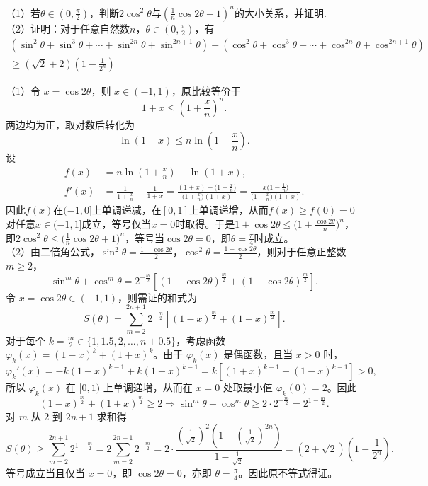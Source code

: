 \newpage
\begin{example}
    （1）若$\theta\in\left(0,\frac{\pi}2\right)$，判断$2\cos^2\theta$与$\left(\frac{1}{n}\cos 2\theta+1\right)^n$的大小关系，并证明.\\
    （2）证明：对于任意自然数$n$，$\theta\in\left(0,\frac{\pi}2\right)$，有
\begin{gather*}
\left(\sin^2\theta+\sin^3\theta+\cdots+\sin^{2n}\theta+\sin^{2n+1}\theta\right)+\left(\cos^2\theta+\cos^3\theta+\cdots+\cos^{2n}\theta+\cos^{2n+1}\theta\right)\\
\geq\left(\sqrt{2}+2\right)\left(1-\frac{1}{2^n}\right)
\end{gather*}
\end{example}
\begin{solution}
（1）令 \(x=\cos2\theta\)，则 \(x\in(-1,1)\)，原比较等价于
\[
1+x\le \left(1+\frac{x}{n}\right)^n.
\]
两边均为正，取对数后转化为
\[
\ln(1+x)\le n\ln\left(1+\frac{x}{n}\right).
\]
设
\begin{align*}
    f(x)&=n\ln\left(1+\frac{x}{n}\right)-\ln(1+x),\\
    f'(x)&=\frac{1}{1+\frac{x}{n}}-\frac{1}{1+x}=\frac{(1+x)-\bigl(1+\frac{x}{n}\bigr)}{\bigl(1+\frac{x}{n}\bigr)(1+x)}=\frac{x\bigl(1-\frac1n\bigr)}{\bigl(1+\frac{x}{n}\bigr)(1+x)}.
\end{align*}
因此$f(x)$在$(-1,0]$上单调递减，在$[0,1]$上单调递增，从而$f(x)\geqslant f(0)=0$对任意$x\in(-1,1]$成立，等号仅当$x=0$时取得。于是$1+\cos2\theta\leqslant\bigl(1+\frac{\cos2\theta}{n}\bigr)^n$，即$2\cos^2\theta\leqslant\bigl(\frac{1}{n}\cos2\theta+1\bigr)^n$，等号当$\cos2\theta=0$，即$\theta=\frac\pi4$时成立。\\
（2）由二倍角公式，\(\sin^2\theta = \frac{1-\cos2\theta}{2}\)，\(\cos^2\theta = \frac{1+\cos2\theta}{2}\)，则对于任意正整数 \(m \geq 2\)，
\[
\sin^m\theta + \cos^m\theta = 2^{-\frac{m}{2}} \left[ (1-\cos2\theta)^{\frac{m}{2}} + (1+\cos2\theta)^{\frac{m}{2}} \right].
\]
令 \(x = \cos2\theta \in (-1,1)\)，则需证的和式为
\[
S(\theta) = \sum_{m=2}^{2n+1} 2^{-\frac{m}{2}} \left[ (1-x)^{\frac{m}{2}} + (1+x)^{\frac{m}{2}} \right].
\]
对于每个 \(k = \frac{m}{2} \in \{1, 1.5, 2, \dots, n+0.5\}\)，考虑函数 \(\varphi_k(x) = (1-x)^k + (1+x)^k\)。由于 \(\varphi_k(x)\) 是偶函数，且当 \(x > 0\) 时，
\[
\varphi_k'(x) = -k(1-x)^{k-1} + k(1+x)^{k-1} = k\left[ (1+x)^{k-1} - (1-x)^{k-1} \right] > 0,
\]
所以 \(\varphi_k(x)\) 在 \([0,1)\) 上单调递增，从而在 \(x=0\) 处取最小值 \(\varphi_k(0)=2\)。因此
\[
(1-x)^{\frac{m}{2}} + (1+x)^{\frac{m}{2}} \geq 2\Rightarrow \sin^m\theta + \cos^m\theta \geq 2 \cdot 2^{-\frac{m}{2}} = 2^{1-\frac{m}{2}}.
\]
对 \(m\) 从 \(2\) 到 \(2n+1\) 求和得
\[
S(\theta) \geq \sum_{m=2}^{2n+1} 2^{1-\frac{m}{2}} = 2 \sum_{m=2}^{2n+1} 2^{-\frac{m}{2}} = 2 \cdot \frac{(\frac{1}{\sqrt{2}})^2 \left(1 - (\frac{1}{\sqrt{2}})^{2n}\right)}{1 - \frac{1}{\sqrt{2}}} = (2+\sqrt{2})\left(1 - \frac{1}{2^n}\right).
\]
等号成立当且仅当 \(x=0\)，即 \(\cos2\theta = 0\)，亦即 \(\theta = \frac{\pi}{4}\)。因此原不等式得证。
\end{solution}

